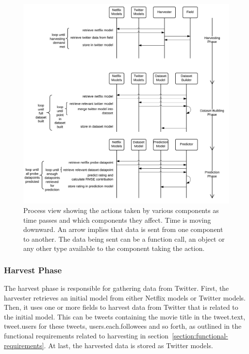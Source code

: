 \begin{figure}[H]
\centerline{\includegraphics[width=7in]{image/architecture-process-view.png}}
\caption[Process view]{Process view showing the actions taken by various components as time passes and which components they affect. Time is moving downward. An arrow implies that data is sent from one component to another. The data being sent can be a function call, an object or any other type available to the component taking the action.}
\label{figure:process-view}
\end{figure}

\subsubsection{Harvest Phase}
The harvest phase is responsible for gathering data from Twitter. First, the harvester retrieves an initial model from either Netflix models or Twitter models. Then, it uses one or more fields to harvest data from Twitter that is related to the initial model. This can be tweets containing the movie title in the tweet.text, tweet.users for these tweets, users.each.followees and so forth, as outlined in the functional requirements related to harvesting in section~\ref{section:functional-requirements}. At last, the harvested data is stored as Twitter models.

